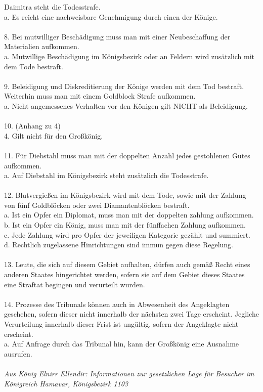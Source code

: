 \documentclass{article}
\begin{document}
Daimitra steht die Todesstrafe.\\
a. Es reicht eine nachweisbare Genehmigung durch einen der Könige.
\\\\
8. Bei mutwilliger Beschädigung muss man mit einer Neubeschaffung der Materialien aufkommen.\\
a. Mutwillige Beschädigung im Königsbezirk oder an Feldern wird zusätzlich mit dem Tode bestraft.
\\\\
9. Beleidigung und Diskreditierung der Könige werden mit dem Tod bestraft. Weiterhin muss man mit einem Goldblock Strafe aufkommen.\\
a. Nicht angemessenes Verhalten vor den Königen gilt NICHT als Beleidigung.
\\\\
10. (Anhang zu 4)\\
4. Gilt nicht für den Großkönig.
\\\\
11. Für Diebstahl muss man mit der doppelten Anzahl jedes gestohlenen Gutes aufkommen.\\
a. Auf Diebstahl im Königsbezirk steht zusätzlich die Todesstrafe.
\\\\
12. Blutvergießen im Königsbezirk wird mit dem Tode, sowie mit der Zahlung von fünf Goldblöcken oder zwei Diamantenblöcken bestraft.\\
a. Ist ein Opfer ein
Diplomat, muss man mit der doppelten zahlung aufkommen.\\
b. Ist ein Opfer ein König, muss man mit der fünffachen Zahlung aufkommen.\\
c. Jede Zahlung wird pro Opfer der jeweiligen Kategorie gezählt und summiert.\\
d. Rechtlich zugelassene Hinrichtungen sind immun gegen diese Regelung.
\\\\
13. Leute, die sich auf diesem Gebiet aufhalten, dürfen auch gemäß Recht eines anderen Staates hingerichtet werden, sofern sie auf dem Gebiet dieses Staates
eine Straftat begingen und verurteilt wurden.
\\\\
14. Prozesse des Tribunals können auch in Abwesenheit des Angeklagten geschehen, sofern dieser nicht innerhalb der nächsten zwei Tage erscheint.
Jegliche Verurteilung innerhalb dieser Frist ist ungültig, sofern
der Angeklagte nicht erscheint.\\
a. Auf Anfrage durch das Tribunal hin, kann der Großkönig eine Ausnahme ausrufen.
\\\\
\textit{Aus König Elnirr Ellendir: Informationen zur gesetzlichen Lage für Besucher im Königreich Hamavar, Königsbezirk 1103}
\end{document}
